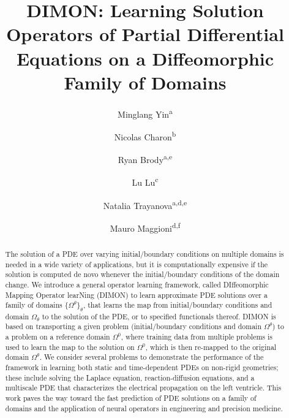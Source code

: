 \documentclass[review]{elsarticle}
\def\Omegatheta{{\Omega^\theta}}
\def\refd{0}
\def\Omegaref{{\Omega^\refd}}
\begin{document}
\begin{frontmatter}

\title{DIMON: Learning Solution Operators of Partial Differential Equations on a Diffeomorphic Family of Domains}


\author{Minglang Yin\textsuperscript{a}}
\author{Nicolas Charon\textsuperscript{b}}
\author{Ryan Brody\textsuperscript{a,e}}
\author{Lu Lu\textsuperscript{c}}
\author{Natalia Trayanova\textsuperscript{a,d,e}}
\author{Mauro Maggioni\textsuperscript{d,f}}

\address[a]{Department of Biomedical Engineering, Johns Hopkins University, Baltimore, MD}
\address[b]{Department of Mathematics, University of Houston, Houston, TX}
\address[c]{Department of Statistics and Data Science, Yale University, New Haven, CT}
\address[d]{Department of Applied Mathematics and Statistics, Johns Hopkins University, Baltimore, MD}
\address[e]{School of Medicine, Johns Hopkins University, Baltimore, MD}
\address[f]{Department of Mathematics, Johns Hopkins University, Baltimore, MD}

\begin{abstract}
The solution of a PDE over varying initial/boundary conditions on multiple domains is needed in a wide variety of applications, but it is computationally expensive if the solution is computed de novo whenever the initial/boundary conditions of the domain change. 
We introduce a general operator learning framework, called DIffeomorphic Mapping Operator learNing (DIMON) to learn approximate PDE solutions over a family of domains $\{\Omegatheta\}_\theta$, that learns the map from initial/boundary conditions and domain $\Omega_\theta$ to the solution of the PDE, or to specified functionals thereof.
DIMON is based on transporting a given problem (initial/boundary conditions and domain $\Omegatheta$) to a problem on a reference domain $\Omegaref$, where training data from multiple problems is used to learn the map to the solution on $\Omegaref$, which is then re-mapped to the original domain $\Omegatheta$.  
We consider several problems to demonstrate the performance of the framework in learning both static and time-dependent PDEs on non-rigid geometries; these include solving the Laplace equation, reaction-diffusion equations, and a multiscale PDE that characterizes the electrical propagation on the left ventricle. This work paves the way toward the fast prediction of PDE solutions on a family of domains and the application of neural operators in engineering and precision medicine. 
\end{abstract}

\end{frontmatter}
\end{document}

